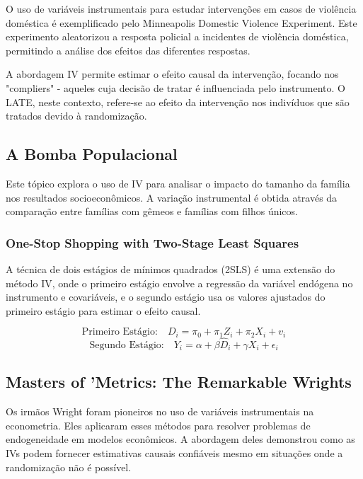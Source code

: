 \documentclass[a4paper,12pt]{article}[abntex2]
\begin{document}
O uso de variáveis instrumentais para estudar intervenções em casos de violência doméstica é exemplificado pelo Minneapolis Domestic Violence Experiment. Este experimento aleatorizou a resposta policial a incidentes de violência doméstica, permitindo a análise dos efeitos das diferentes respostas.

A abordagem IV permite estimar o efeito causal da intervenção, focando nos "compliers" - aqueles cuja decisão de tratar é influenciada pelo instrumento. O LATE, neste contexto, refere-se ao efeito da intervenção nos indivíduos que são tratados devido à randomização.

\subsection{A Bomba Populacional}

Este tópico explora o uso de IV para analisar o impacto do tamanho da família nos resultados socioeconômicos. A variação instrumental é obtida através da comparação entre famílias com gêmeos e famílias com filhos únicos.

\subsubsection*{One-Stop Shopping with Two-Stage Least Squares}

A técnica de dois estágios de mínimos quadrados (2SLS) é uma extensão do método IV, onde o primeiro estágio envolve a regressão da variável endógena no instrumento e covariáveis, e o segundo estágio usa os valores ajustados do primeiro estágio para estimar o efeito causal.

\begin{equation}
    \text{Primeiro Estágio:} \quad D_i = \pi_0 + \pi_1 Z_i + \pi_2 X_i + v_i
\end{equation}
\begin{equation}
    \text{Segundo Estágio:} \quad Y_i = \alpha + \beta \hat{D}_i + \gamma X_i + \epsilon_i
\end{equation}

\subsection*{Masters of 'Metrics: The Remarkable Wrights}

Os irmãos Wright foram pioneiros no uso de variáveis instrumentais na econometria. Eles aplicaram esses métodos para resolver problemas de endogeneidade em modelos econômicos. A abordagem deles demonstrou como as IVs podem fornecer estimativas causais confiáveis mesmo em situações onde a randomização não é possível.
\end{document}
